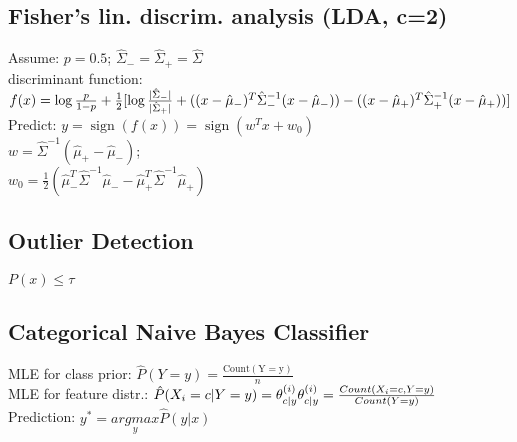 \subsection*{Fisher's lin. discrim. analysis (LDA, c=2)}
Assume: $p = 0.5$; $\hat{\Sigma}_- = \hat{\Sigma}_+ = \hat{\Sigma}$\\
discriminant function: 
$f(x) = \operatorname{log} \frac{p}{1-p} + \\
\frac{1}{2}[\operatorname{log} \frac{|\hat{\Sigma}_-|}{|\hat{\Sigma}_+|}
+ ((x - \hat{\mu}_-)^T \hat{\Sigma}_-^{-1} (x - \hat{\mu}_-)) - \\
((x - \hat{\mu}_+)^T \hat{\Sigma}_+^{-1} (x - \hat{\mu}_+))]$\\
Predict: $y = \operatorname{sign}(f(x)) = \operatorname{sign} (w^T x + w_0)$\\
$w = \hat{\Sigma}^{-1}(\hat{\mu}_+ - \hat{\mu}_-)$; \\
$w_0 = \frac{1}{2}(\hat{\mu}_-^T\hat{\Sigma}^{-1}\hat{\mu}_- - \hat{\mu}_+^T \hat{\Sigma}^{-1}\hat{\mu}_+)$

\subsection*{Outlier Detection}
$P(x) \leq \tau$

\subsection*{Categorical Naive Bayes Classifier}
MLE for class prior: $\hat{P}(Y=y) = \frac{\operatorname{Count(Y = y)}}{n}$\\
MLE for feature distr.:
$\hat{P}(X_i = c|Y = y) = \theta_{c|y}^{(i)}\\
\theta_{c|y}^{(i)} = \frac{Count(X_i = c, Y = y)}{Count(Y=y)}$\\
Prediction: $y^* = \underset{y}{argmax}\hat{P}(y|x)$